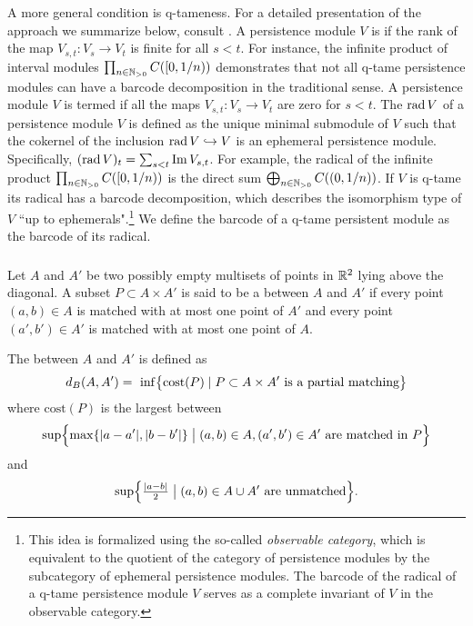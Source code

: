 A more general condition is q-tameness.
For a detailed presentation of the approach we summarize below, consult \cite{Chazal.2016a, Chazal.2016b}.
A persistence module \(V\) is  if the rank of the map \(V_{s,t} \colon V_s \to V_t\) is finite for all \(s < t\).
For instance, the infinite product of interval modules \(\prod_{n \in \N_{> 0}} C([0,1/n))\) demonstrates that not all q-tame persistence modules can have a barcode decomposition in the traditional sense.
A persistence module \(V\) is termed  if all the maps \(V_{s,t} \colon V_s \to V_t\) are zero for \(s < t\).
The  \(\rad V\) of a persistence module \(V\) is defined as the unique minimal submodule of \(V\) such that the cokernel of the inclusion \(\rad V \hookrightarrow V\) is an ephemeral persistence module.
Specifically, \((\rad V)_t = \sum_{s<t} \img V_{s,t}\).
For example, the radical of the infinite product \(\prod_{n \in \N_{> 0}} C([0, 1/n))\) is the direct sum \(\bigoplus_{n \in \N_{> 0}} C((0,1/n))\).
If \(V\) is q-tame its radical has a barcode decomposition, which describes the isomorphism type of \(V\) ``up to ephemerals".\footnote{
This idea is formalized using the so-called \textit{observable category}, which is equivalent to the quotient of the category of persistence modules by the subcategory of ephemeral persistence modules.
The barcode of the radical of a q-tame persistence module \(V\) serves as a complete invariant of \(V\) in the observable category.}
We define the barcode of a q-tame persistent module as the barcode of its radical.

\subsubsection{}
\label{ss:algebraic_stability}
Let $A$ and $A'$ be two possibly empty multisets of points in $\R^2$ lying above the diagonal.
A subset $P \subset A \times A'$ is said to be a  between $A$ and $A'$ if every point $(a, b) \in A$ is matched with at most one point of $A'$ and every point $(a', b') \in A'$ is matched with at most one point of $A$.

The  between $A$ and $A'$ is defined as
\[
d_B(A, A') = \
\inf \set[\big]{\mathrm{cost}(P) \mid P \subset A \times A' \text{ is a partial matching}}
\]
where $\mathrm{cost}(P)$ is the largest between
\[
\sup \set[\Big]{\max\set{|a - a'|, |b - b'|} \bigm| (a, b) \in A, (a', b') \in A' \text{ are matched in }P}
\]
and
\[
\sup \set[\Big]{\tfrac{ |a - b|}{2}  \bigm| (a, b) \in A \cup A' \text{ are unmatched}}.
\]

